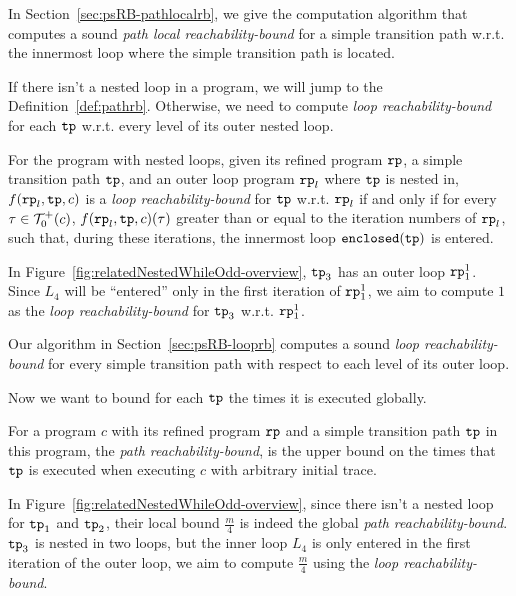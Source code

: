 In Section~\ref{sec:psRB-pathlocalrb}, we give the computation algorithm that computes a sound \emph{path local reachability-bound} for a simple transition path w.r.t. the innermost loop where the simple transition path is located.


If there isn't a nested loop in a program, we will jump to the Definition~\ref{def:pathrb}.
Otherwise, we need to compute \emph{loop reachability-bound}
for each $\mathtt{tp}$ w.r.t. every level of its outer nested loop.
\begin{defn}
For the program with nested loops, given its refined program $\mathtt{rp}$, a simple transition path $\mathtt{tp}$, and an outer loop
program $\mathtt{rp}_l$ where $\mathtt{tp}$ is nested in,
$f(\mathtt{rp}_l, \mathtt{tp}, c)$ is a \emph{loop reachability-bound} for $\mathtt{tp}$ w.r.t. $\mathtt{rp}_l$ if and only if
for every $\mathtt{\tau} \in \mathcal{T}^{+}_0(c)$, $f(\mathtt{rp}_l, \mathtt{tp}, c)(\mathtt{\tau})$ greater than or equal to the
iteration numbers of $\mathtt{rp}_l$,
such that,
during these iterations, the innermost loop $\mathtt{enclosed(\mathtt{tp})}$ is entered.
\end{defn}
In Figure~\ref{fig:relatedNestedWhileOdd-overview}, $\mathtt{tp}_3$ has an outer loop $\mathtt{rp}_1^1$. Since $L_4$ will be ``entered'' only in the first iteration of $\mathtt{rp}_1^1$,
we aim to compute $1$ as the \emph{loop reachability-bound} for $\mathtt{tp}_3$ w.r.t. $\mathtt{rp}_1^1$.

Our algorithm in Section~\ref{sec:psRB-looprb} computes a sound \emph{loop reachability-bound} for every
simple transition path with respect to each level of its outer loop.

Now we want to bound for each $\mathtt{tp}$ the times it is executed globally.
\begin{defn}
For a program $c$ with its refined program $\mathtt{rp}$ and a simple transition path $\mathtt{tp}$ in this program, 
the \emph{path reachability-bound},
is the upper bound on the
times that $\mathtt{tp}$ is executed when executing $c$ with arbitrary initial trace.
\end{defn}
%
In Figure~\ref{fig:relatedNestedWhileOdd-overview}, since there isn't a nested loop for $\mathtt{tp}_1$ and $\mathtt{tp}_2$, their local bound $\frac{m}{4}$ is indeed the global \emph{path reachability-bound}.
$\mathtt{tp}_3$ is nested in two loops, but the inner loop $L_4$ is only entered in the first iteration of the outer loop, we aim to compute $\frac{m}{4}$ using the \emph{loop reachability-bound}.

